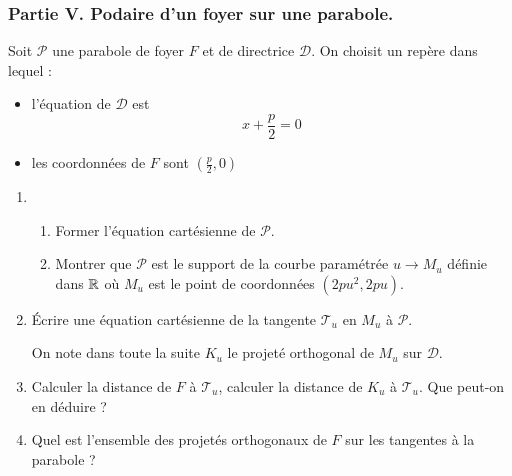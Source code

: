 \subsubsection*{Partie V. Podaire d'un foyer sur une parabole.}
Soit $\mathcal P$ une parabole de foyer $F$ et de directrice $\mathcal D$. On choisit un repère dans lequel :
\begin{itemize}
 \item l'équation de $\mathcal D$ est
\begin{displaymath}
 x+\frac{p}{2}=0
\end{displaymath}
\item les coordonnées de $F$ sont $(\frac{p}{2},0)$
\end{itemize}
\begin{enumerate}
 \item \begin{enumerate}
 \item Former l'équation cartésienne de $\mathcal P$.
 \item Montrer que $\mathcal P$ est le support de la courbe paramétrée $u \rightarrow M_u$ définie dans $\mathbb{R}$ où $M_u$ est le point de coordonnées $(2pu^2,2pu)$.
\end{enumerate}
\item \'Ecrire une équation cartésienne de la tangente $\mathcal T_u$ en $M_u$ à $\mathcal P$.

On note dans toute la suite $K_u$ le projeté orthogonal de $M_u$ sur $\mathcal D$.

\item Calculer la distance de $F$ à $\mathcal T_u$, calculer la distance de $K_u$ à $\mathcal T_u$. Que peut-on en déduire ?
\item  Quel est l'ensemble des projetés orthogonaux de $F$ sur les tangentes à la parabole ?
\end{enumerate}

